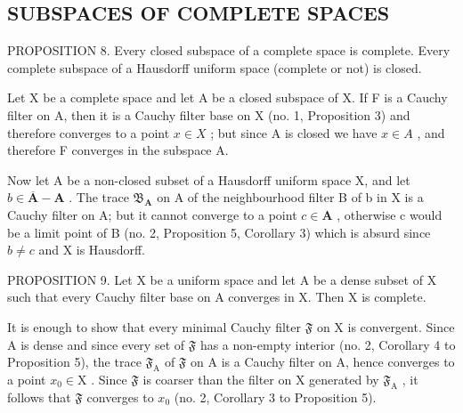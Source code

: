 \subsection{SUBSPACES OF COMPLETE SPACES}

PROPOSITION 8. Every closed subspace of a complete space is complete. Every complete subspace of a Hausdorff uniform space (complete or not) is closed.

Let X be a complete space and let A be a closed subspace of X. If F is a Cauchy filter on A, then it is a Cauchy filter base on X (no. 1, Proposition 3) and therefore converges to a point \(x \in X\) ; but since A is closed we have \(x \in A\) , and therefore F converges in the subspace A.

Now let A be a non-closed subset of a Hausdorff uniform space X, and let \(b \in \overline{\mathbf{A}} - \mathbf{A}\) . The trace \(\mathfrak{B}_{\mathbf{A}}\) on A of the neighbourhood filter B of b in X is a Cauchy filter on A; but it cannot converge to a point \(c \in \mathbf{A}\) , otherwise c would be a limit point of B (no. 2, Proposition 5, Corollary 3) which is absurd since \(b \neq c\) and X is Hausdorff.

PROPOSITION 9. Let X be a uniform space and let A be a dense subset of X such that every Cauchy filter base on A converges in X. Then X is complete.

It is enough to show that every minimal Cauchy filter \(\mathfrak{F}\) on X is convergent. Since A is dense and since every set of \(\mathfrak{F}\) has a non-empty interior (no. 2, Corollary 4 to Proposition 5), the trace \(\mathfrak{F}_{\mathrm{A}}\) of \(\mathfrak{F}\) on A is a Cauchy filter on A, hence converges to a point \(x_{0} \in \mathrm{X}\) . Since \(\mathfrak{F}\) is coarser than the filter on X generated by \(\mathfrak{F}_{\mathrm{A}}\) , it follows that \(\mathfrak{F}\) converges to \(x_{0}\) (no. 2, Corollary 3 to Proposition 5).

